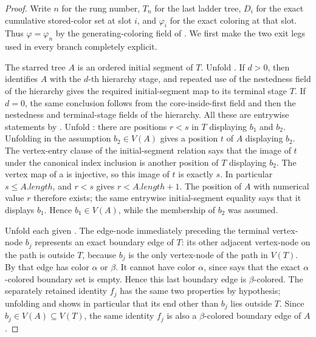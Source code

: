 \begin{proof}
Write $n$ for the rung number, $T_n$ for the last ladder tree, $D_i$ for
the exact cumulative stored-color set at slot $i$, and $\varphi_i$ for
the exact coloring at that slot.  Thus $\varphi=\varphi_n$ by the
generating-coloring field of .  We first
make the two exit legs used in every branch completely explicit.

The starred tree $A$ is an ordered initial segment of $T$.  Unfold
.  If
$d>0$, then  identifies $A$ with the
$d$-th hierarchy stage, and repeated use of the nestedness field of the
hierarchy gives the required initial-segment map to its terminal stage
$T$.  If $d=0$, the same conclusion follows from the core-inside-first
field and then the nestedness and terminal-stage fields of the hierarchy.
All these are entrywise statements by
.  Unfold
: there are positions $r<s$ in $T$ displaying
$b_1$ and $b_2$.  Unfolding  in the
assumption $b_2\in V(A)$ gives a position $t$ of $A$ displaying $b_2$.
The vertex-entry clause of the initial-segment relation says that the
image of $t$ under the canonical index inclusion is another position of
$T$ displaying $b_2$.  The vertex map of a  is
injective, so this image of $t$ is exactly $s$.  In particular
$s\leq A.\mathit{length}$, and $r<s$ gives
$r<A.\mathit{length}+1$.  The position of $A$ with numerical value $r$
therefore exists; the same entrywise initial-segment equality says that
it displays $b_1$.  Hence $b_1\in V(A)$, while the membership of $b_2$
was assumed.

Unfold each given .  The edge-node immediately
preceding the terminal vertex-node $b_j$ represents an exact boundary
edge of $T$: its other adjacent vertex-node on the path is outside $T$,
because $b_j$ is the only vertex-node of the path in $V(T)$.  By
 that edge has color $\alpha$ or
$\beta$.  It cannot have color $\alpha$, since
 says that the exact $\alpha$-colored
boundary set is empty.  Hence this last boundary edge is
$\beta$-colored.  The separately retained identity $f_j$ has the same
two properties by hypothesis; unfolding 
and  shows in particular that its end other than
$b_j$ lies outside $T$.  Since $b_j\in V(A)\subseteq V(T)$, the same
identity $f_j$ is also a $\beta$-colored boundary edge of $A$.


\end{proof}
